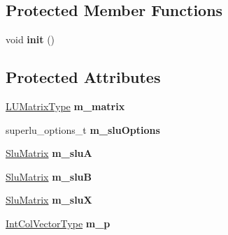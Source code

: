 \subsection*{Protected Member Functions}
\begin{DoxyCompactItemize}
\item 
\mbox{\label{class_eigen_1_1_super_l_u_afbdaacabc52182e6f31a1975469545ce}} 
void {\bfseries init} ()
\end{DoxyCompactItemize}
\subsection*{Protected Attributes}
\begin{DoxyCompactItemize}
\item 
\mbox{\label{class_eigen_1_1_super_l_u_a0f034c77e8af4c979490c81e6b8f48b8}} 
\mbox{\hyperlink{class_eigen_1_1_sparse_matrix}{L\+U\+Matrix\+Type}} {\bfseries m\+\_\+matrix}
\item 
\mbox{\label{class_eigen_1_1_super_l_u_a28626fc764baefca0c5a5b0b823d0eb9}} 
superlu\+\_\+options\+\_\+t {\bfseries m\+\_\+slu\+Options}
\item 
\mbox{\label{class_eigen_1_1_super_l_u_aceced6387cae8308264a1f8e20bd4d4e}} 
\mbox{\hyperlink{struct_eigen_1_1_slu_matrix}{Slu\+Matrix}} {\bfseries m\+\_\+sluA}
\item 
\mbox{\label{class_eigen_1_1_super_l_u_a32de3a4dddb541e4f4fc34b52db2e58a}} 
\mbox{\hyperlink{struct_eigen_1_1_slu_matrix}{Slu\+Matrix}} {\bfseries m\+\_\+sluB}
\item 
\mbox{\label{class_eigen_1_1_super_l_u_a03baac0bbb4a3329e881f454fde5fb8e}} 
\mbox{\hyperlink{struct_eigen_1_1_slu_matrix}{Slu\+Matrix}} {\bfseries m\+\_\+sluX}
\item 
\mbox{\label{class_eigen_1_1_super_l_u_af1141a75e3370ce65d120ceb11494ef8}} 
\mbox{\hyperlink{class_eigen_1_1_matrix}{Int\+Col\+Vector\+Type}} {\bfseries m\+\_\+p}
\item 
\mbox{\label{class_eigen_1_1_super_l_u_a6595554b9f2950bee687a603c041775c}} 

\end{DoxyCompactItemize}
